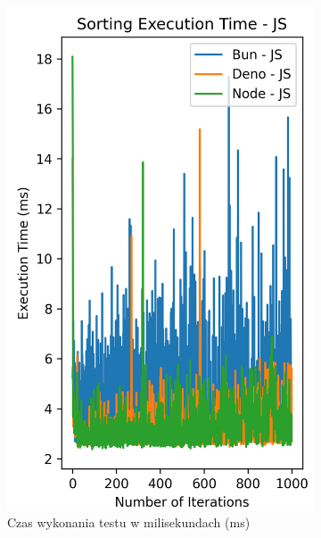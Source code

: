 \begin{figure}[H]
  \centering
  \begin{subfigure}[b]{0.4\textwidth}
    \centering
    \includegraphics[width=\textwidth]{Figures/sorting/sorting_quick_1000_10000_js_time.png}
    \caption{Czas wykonania testu w milisekundach (ms)}
    \label{fig:quick_sorting_e4_time}
  \end{subfigure}
  \begin{subfigure}[b]{0.4\textwidth}
    \centering

\end{subfigure}
\end{figure}
